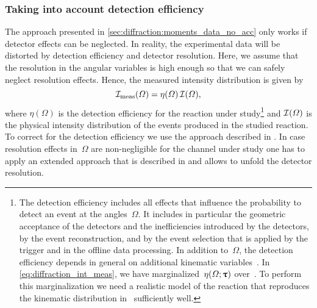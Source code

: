 \subsubsection{Taking into account detection efficiency}%
\label{sec:diffraction:acceptance_corr}

The approach presented in \cref{sec:diffraction:moments_data_no_acc}
only works if detector effects can be neglected.  In reality, the
experimental data will be distorted by detection efficiency and
detector resolution.  Here, we assume that the resolution in the
angular variables is high enough so that we can safely neglect
resolution effects.  Hence, the measured intensity distribution is
given by
\begin{equation}
  \label{eq:diffraction_int_meas}
  \mathcal{I}_\text{meas}(\Omega)
  = \eta(\Omega)\, \mathcal{I}(\Omega),
\end{equation}
where $\eta(\Omega)$ is the detection efficiency for the reaction
under study\footnote{The detection efficiency includes all effects
that influence the probability to detect an event at the
angles~$\Omega$.  It includes in particular the geometric acceptance
of the detectors and the inefficiencies introduced by the detectors,
by the event reconstruction, and by the event selection that is
applied by the trigger and in the offline data processing.  In
addition to~$\Omega$, the detection efficiency depends in general on
additional kinematic variables~\vect{\uptau}.  In
\cref{eq:diffraction_int_meas}, we have marginalized~$\eta(\Omega;
\bm{\mathrm{\uptau}})$ over~\vect{\uptau}.  To perform this marginalization
we need a realistic model of the reaction that reproduces the
kinematic distribution in~\vect{\uptau} sufficiently well.} and
$\mathcal{I}(\Omega)$ is the physical intensity distribution of the
events produced in the studied reaction.  To correct for the detection
efficiency we use the approach described in
.
In case resolution effects in~$\Omega$ are non-negligible for the
channel under study one has to apply an extended approach that is
described in 
and allows to unfold the detector resolution.

